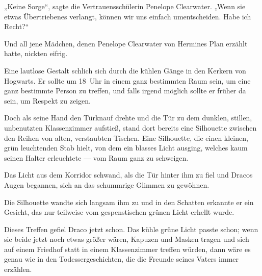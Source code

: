 „Keine Sorge“, sagte die Vertrauensschülerin Penelope Clearwater.
„Wenn sie etwas Übertriebenes verlangt, können wir uns einfach umentscheiden. Habe ich Recht?“

Und all jene Mädchen, denen Penelope Clearwater von Hermines Plan erzählt hatte, nickten eifrig.

\later

Eine lautlose Gestalt schlich sich durch die kühlen Gänge in den Kerkern von Hogwarts. Er sollte um 18~Uhr in einem ganz bestimmten Raum sein, um eine ganz bestimmte Person zu treffen, und falls irgend möglich sollte er früher da sein, um Respekt zu zeigen.

Doch als seine Hand den Türknauf drehte und die Tür zu dem dunklen, stillen, unbenutzten Klassenzimmer aufstieß, stand dort bereits eine Silhouette zwischen den Reihen von alten, verstaubten Tischen. Eine Silhouette, die einen kleinen, grün leuchtenden Stab hielt, von dem ein blasses Licht ausging, welches kaum seinen Halter erleuchtete — vom Raum ganz zu schweigen.

Das Licht aus dem Korridor schwand, als die Tür hinter ihm zu fiel und Dracos Augen begannen, sich an das schummrige Glimmen zu gewöhnen.

Die Silhouette wandte sich langsam ihm zu und in den Schatten erkannte er ein Gesicht, das nur teilweise vom gespenstischen grünen Licht erhellt wurde.

Dieses Treffen gefiel Draco jetzt schon. Das kühle grüne Licht passte schon; wenn sie beide jetzt noch etwas größer wären, Kapuzen und Masken tragen und sich auf einem Friedhof statt in einem Klassenzimmer treffen würden, dann wäre es genau wie in den Todessergeschichten, die die Freunde seines Vaters immer erzählen.


